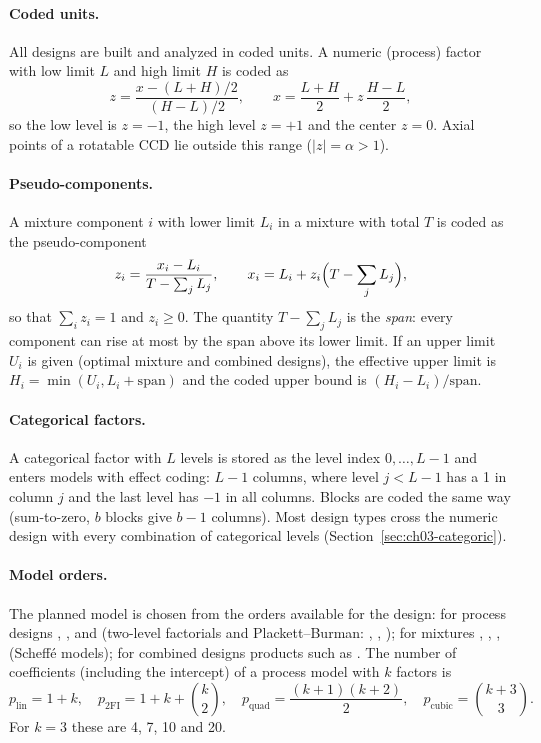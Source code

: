 \paragraph{Coded units.} All designs are built and analyzed in coded units. A numeric (process) factor with low
limit $L$ and high limit $H$ is coded as
\begin{equation}
z = \frac{x - (L+H)/2}{(H-L)/2}, \qquad x = \frac{L+H}{2} + z\,\frac{H-L}{2},
\label{eq:ch03-coding}
\end{equation}
so the low level is $z=-1$, the high level $z=+1$ and the center $z=0$. Axial points of a rotatable CCD lie outside
this range ($|z| = \alpha > 1$).

\paragraph{Pseudo-components.} A mixture component $i$ with lower limit $L_i$ in a mixture with total $T$ is coded
as the pseudo-component \citep{cornell2002}
\begin{equation}
z_i = \frac{x_i - L_i}{T - \sum_j L_j}, \qquad x_i = L_i + z_i \Bigl(T - \sum_j L_j\Bigr),
\label{eq:ch03-pseudo}
\end{equation}
so that $\sum_i z_i = 1$ and $z_i \ge 0$. The quantity $T - \sum_j L_j$ is the \emph{span}: every component can
rise at most by the span above its lower limit. If an upper limit $U_i$ is given (optimal mixture and combined
designs), the effective upper limit is $H_i = \min(U_i, L_i + \text{span})$ and the coded upper bound is
$(H_i - L_i)/\text{span}$.

\paragraph{Categorical factors.} A categorical factor with $L$ levels is stored as the level index $0, \dots, L-1$
and enters models with effect coding: $L-1$ columns, where level $j<L-1$ has a 1 in column $j$ and the last level
has $-1$ in all columns. Blocks are coded the same way (sum-to-zero, $b$ blocks give $b-1$ columns). Most design
types cross the numeric design with every combination of categorical levels (Section~\ref{sec:ch03-categoric}).

\paragraph{Model orders.} The planned model is chosen from the orders available for the design: for process
designs , ,  and  (two-level factorials and
Plackett--Burman: , , ); for mixtures , , ,
 (Scheff\'e models); for combined designs products such as . The number of
coefficients (including the intercept) of a process model with $k$ factors is
\begin{equation}
p_{\text{lin}} = 1+k,\quad p_{\text{2FI}} = 1 + k + \binom{k}{2},\quad
p_{\text{quad}} = \frac{(k+1)(k+2)}{2},\quad p_{\text{cubic}} = \binom{k+3}{3}.
\label{eq:ch03-ncoef}
\end{equation}
For $k = 3$ these are 4, 7, 10 and 20.

